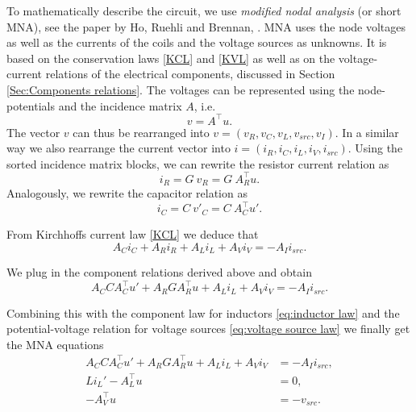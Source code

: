 To mathematically describe the circuit, we use \emph{modified nodal analysis} (or short MNA), see the paper by Ho, Ruehli and Brennan, \cite{MNA75}. MNA uses the node voltages as well as the currents of the coils and the voltage sources as unknowns. It is based on the conservation laws \eqref{KCL} and \eqref{KVL} as well as on the voltage-current relations of the electrical components, discussed in Section \ref{Sec:Components relations}. The voltages can be represented using the node-potentials and the incidence matrix $A$, i.e.
\begin{displaymath}
	v = A^\top u.
\end{displaymath}
The vector $v$ can thus be rearranged into $v = (v_R, v_C, v_L, v_{src}, v_I)$. In a similar way we also rearrange the current vector into $i = (i_R, i_C, i_L, i_V, i_{src})$. Using the sorted incidence matrix blocks, we can rewrite the resistor current relation as
	\begin{displaymath}
		i_R = G \ v_R = G \ A_R^\top u.
	\end{displaymath}
Analogously, we rewrite the capacitor relation as
	\begin{displaymath}
		i_C = C \ v'_C = C \ A_C^\top u'.
	\end{displaymath}

From Kirchhoffs current law \eqref{KCL} we deduce that
\begin{displaymath}
	A_C i_C + A_R i_R + A_L i_L + A_V i_V = -A_I i_{src}.
\end{displaymath}

We plug in the component relations derived above and obtain
\begin{displaymath}
	A_C C A_C^\top u' + A_R G A_R^\top u + A_L i_L + A_V i_V = -A_I i_{src}.
 \end{displaymath}

Combining this with the component law for inductors \eqref{eq:inductor law} and the potential-voltage relation for voltage sources \eqref{eq:voltage source law} we finally get the MNA equations
\begin{displaymath}
	\begin{aligned}
		A_C C A_C^\top u' + A_R G A_R^\top u + A_L i_L + A_V i_V &= - A_I i_{src} , \\
		L i_L'	- A_L^\top u &= 0 , \\
		-A_V^\top u &=  -v_{src}.
	\end{aligned}	
\end{displaymath}

